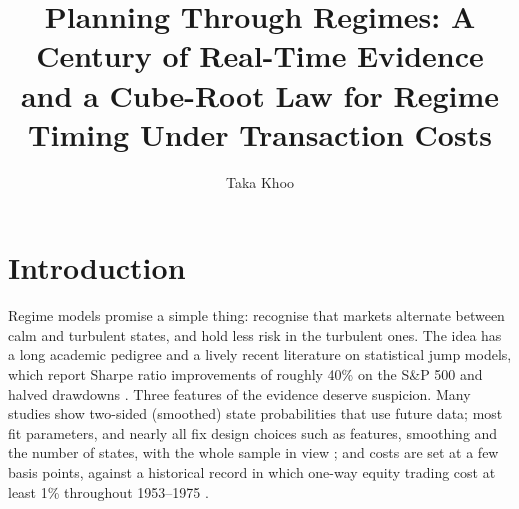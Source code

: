 \documentclass[sigconf,nonacm]{acmart}
\title{Planning Through Regimes: A Century of Real-Time Evidence and a Cube-Root Law for Regime Timing Under Transaction Costs}
\author{Taka Khoo}
\affiliation{\institution{Independent researcher}\country{}}
\begin{document}
\maketitle
{}\par\medskip

\section{Introduction}
Regime models promise a simple thing: recognise that markets alternate between calm and turbulent states, and hold less risk in the turbulent ones. The idea has a long academic pedigree \cite{hamilton1989,ang2002international,guidolin2007asset,ang2012regime} and a lively recent literature on statistical jump models, which report Sharpe ratio improvements of roughly 40\% on the S\&P 500 and halved drawdowns \cite{nystrup2020penalizing,aydinhan2024identifying,shu2024downside}. Three features of the evidence deserve suspicion. Many studies show two-sided (smoothed) state probabilities that use future data; most fit parameters, and nearly all fix design choices such as features, smoothing and the number of states, with the whole sample in view \cite{bailey2014pseudo,harvey2016cross}; and costs are set at a few basis points, against a historical record in which one-way equity trading cost at least 1\% throughout 1953--1975 \cite{jones2002century}.
\end{document}
